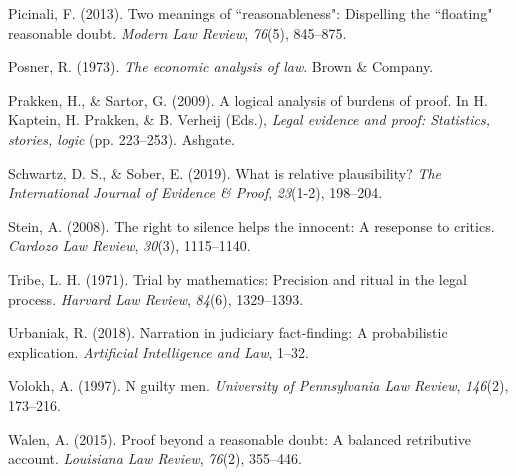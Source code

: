 \documentclass[10pt,dvipsnames]{scrartcl}
\begin{document}
\leavevmode\hypertarget{ref-picinali2013}{}%
Picinali, F. (2013). Two meanings of ``reasonableness": Dispelling the
``floating" reasonable doubt. \emph{Modern Law Review}, \emph{76}(5),
845--875.

\leavevmode\hypertarget{ref-Posner1973}{}%
Posner, R. (1973). \emph{The economic analysis of law}. Brown \&
Company.

\leavevmode\hypertarget{ref-prakken2009}{}%
Prakken, H., \& Sartor, G. (2009). A logical analysis of burdens of
proof. In H. Kaptein, H. Prakken, \& B. Verheij (Eds.), \emph{Legal
evidence and proof: Statistics, stories, logic} (pp. 223--253). Ashgate.

\leavevmode\hypertarget{ref-schwartz2019WhatRelativePlausibility}{}%
Schwartz, D. S., \& Sober, E. (2019). What is relative plausibility?
\emph{The International Journal of Evidence \& Proof}, \emph{23}(1-2),
198--204.

\leavevmode\hypertarget{ref-stein2008}{}%
Stein, A. (2008). The right to silence helps the innocent: A reseponse
to critics. \emph{Cardozo Law Review}, \emph{30}(3), 1115--1140.

\leavevmode\hypertarget{ref-tribe71}{}%
Tribe, L. H. (1971). Trial by mathematics: Precision and ritual in the
legal process. \emph{Harvard Law Review}, \emph{84}(6), 1329--1393.

\leavevmode\hypertarget{ref-Urbaniak2017Narration-in-ju}{}%
Urbaniak, R. (2018). Narration in judiciary fact-finding: A
probabilistic explication. \emph{Artificial Intelligence and Law},
1--32.

\leavevmode\hypertarget{ref-voloch1997}{}%
Volokh, A. (1997). N guilty men. \emph{University of Pennsylvania Law
Review}, \emph{146}(2), 173--216.

\leavevmode\hypertarget{ref-walen2015}{}%
Walen, A. (2015). Proof beyond a reasonable doubt: A balanced
retributive account. \emph{Louisiana Law Review}, \emph{76}(2),
355--446.
\end{document}

